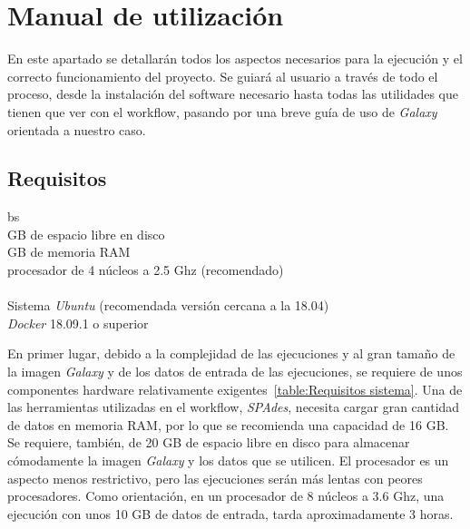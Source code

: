 \chapter{Manual de utilización}
\label{Anexo:manualuso}
En este apartado se detallarán todos los aspectos necesarios para la ejecución y el correcto funcionamiento del proyecto. Se guiará al usuario a través de todo el proceso, desde la instalación del software necesario hasta todas las utilidades que tienen que ver con el workflow, pasando por una breve guía de uso de \textit{Galaxy} orientada a nuestro caso.
\section{Requisitos}

\begin{table}[!h]

\begin{center}
\begin{tabularx}{\textwidth}{bs}
\hline
{}\\
 GB de espacio libre en disco \\

 GB de memoria RAM \\

\quad procesador de 4 núcleos a 2.5 Ghz (recomendado) \\

\hline
{} \\
\quad Sistema \textit{Ubuntu} (recomendada versión cercana a la 18.04) \\

\quad \textit{Docker} 18.09.1 o superior\\

\hline

\end{tabularx}
\end{center}
\label{table:Requisitos sistema}
\caption{Requisitos del sistema}
\end{table}
En primer lugar, debido a la complejidad de las ejecuciones y al gran tamaño de la imagen \textit{Galaxy} y de los datos de entrada de las ejecuciones, se requiere de unos componentes hardware relativamente exigentes~\ref{table:Requisitos sistema}. Una de las herramientas utilizadas en el workflow, \textit{SPAdes}, necesita cargar gran cantidad de datos en memoria RAM, por lo que se recomienda una capacidad de 16 GB. Se requiere, también, de 20 GB de espacio libre en disco para almacenar cómodamente la imagen \textit{Galaxy} y los datos que se utilicen. El procesador es un aspecto menos restrictivo, pero las ejecuciones serán más lentas con peores procesadores. Como orientación, en un procesador de 8 núcleos a 3.6 Ghz, una ejecución con unos 10 GB de datos de entrada, tarda aproximadamente 3 horas.

